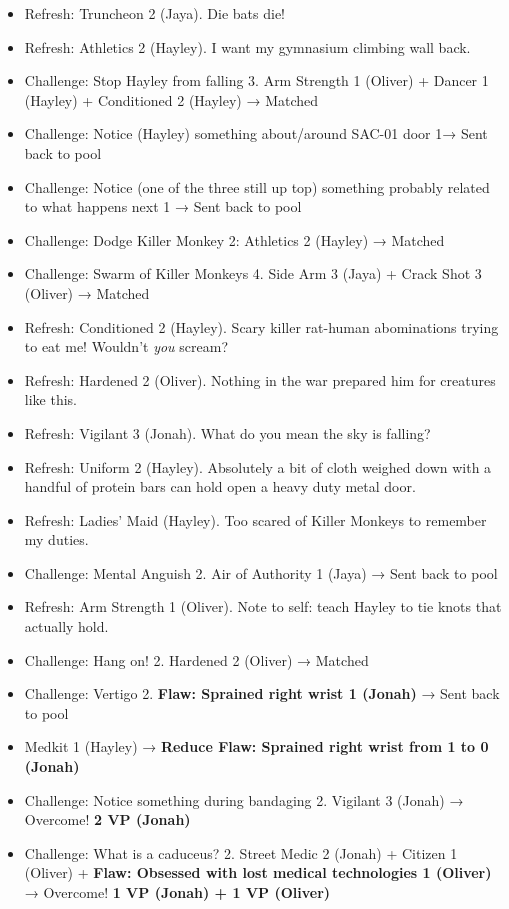 \begin{itemize}
\item Refresh: Truncheon 2 (Jaya).  Die bats die!
\item Refresh: Athletics 2 (Hayley).  I want my gymnasium climbing wall back.
\item Challenge: Stop Hayley from falling 3.  Arm Strength 1 (Oliver) + Dancer 1 (Hayley) + Conditioned 2 (Hayley) → Matched
\item Challenge: Notice (Hayley) something about/around SAC-01 door 1→ Sent back to pool
\item Challenge: Notice  (one of the three still up top) something probably related to what happens next 1 → Sent back to pool
\item Challenge: Dodge Killer Monkey 2: Athletics 2 (Hayley) → Matched
\item Challenge: Swarm of Killer Monkeys 4.  Side Arm 3 (Jaya) + Crack Shot 3 (Oliver) → Matched
\item Refresh: Conditioned 2 (Hayley).  Scary killer rat-human abominations trying to eat me!  Wouldn't \textit{you} scream?
\item Refresh: Hardened 2 (Oliver). Nothing in the war prepared him for creatures like this.
\item Refresh: Vigilant 3 (Jonah).  What do you mean the sky is falling?
\item Refresh: Uniform 2 (Hayley).  Absolutely a bit of cloth weighed down with a handful of protein bars can hold open a heavy duty metal door.
\item Refresh: Ladies' Maid (Hayley). Too scared of Killer Monkeys to remember my duties.
\item Challenge: Mental Anguish 2.  Air of Authority 1 (Jaya) → Sent back to pool
\item Refresh: Arm Strength 1 (Oliver).  Note to self: teach Hayley to tie knots that actually hold.
\item Challenge: Hang on! 2. Hardened 2 (Oliver) → Matched
\item Challenge: Vertigo 2. \textbf{ {\color[RGB]{255,0,0}Flaw: Sprained right wrist 1 (Jonah)} } {\color[RGB]{255,0,0} } → Sent back to pool
\item Medkit 1 (Hayley) → \textbf{ {\color[RGB]{255,0,0}Reduce Flaw: Sprained right wrist from 1 to 0 (Jonah)} }
\item Challenge: Notice something during bandaging 2.  Vigilant 3 (Jonah) → Overcome! \textbf{2 VP (Jonah)}
\item Challenge: What is a caduceus? 2.  Street Medic 2 (Jonah) + Citizen 1 (Oliver) + \textbf{ {\color[RGB]{255,0,0}Flaw: Obsessed with lost medical technologies 1 (Oliver)} }\textbf{ }→ Overcome! \textbf{1 VP (Jonah) + 1 VP (Oliver)}

\end{itemize}
